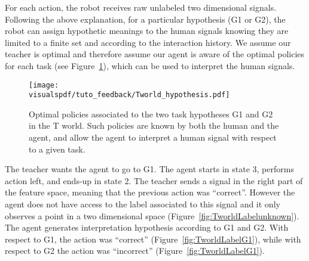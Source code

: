 

For each action, the robot receives raw unlabeled two dimensional signals. Following the above explanation, for a particular hypothesis (G1 or G2), the robot can assign hypothetic meanings to the human signals knowing they are limited to a finite set and according to the interaction history. We assume our teacher is optimal and therefore assume our agent is aware of the optimal policies for each task  (see Figure~\ref{fig:Twolrdpolicies}), which can be used to interpret the human signals.



\begin{figure}[!htbp]
  \centering
  \texttt{[image: \\visualspdf/tuto\_feedback/Tworld\_hypothesis.pdf]}
  \caption{Optimal policies associated to the two task hypotheses G1 and G2 in the T world. Such policies are known by both the human and the agent, and allow the agent to interpret a human signal with respect to a given task.}
  \label{fig:Twolrdpolicies}
\end{figure}

The teacher wants the agent to go to G1. The agent starts in state 3, performs action left, and ends-up in state 2. The teacher sends a signal in the right part of the feature space, meaning that the previous action was ``correct''. However the agent does not have access to the label associated to this signal and it only observes a point in a two dimensional space (Figure~\ref{fig:TworldLabelunknown}). The agent generates interpretation hypothesis according to G1 and G2. With respect to G1, the action was ``correct'' (Figure~\ref{fig:TworldLabelG1}), while with respect to G2 the action was ``incorrect'' (Figure~\ref{fig:TworldLabelG1}).

